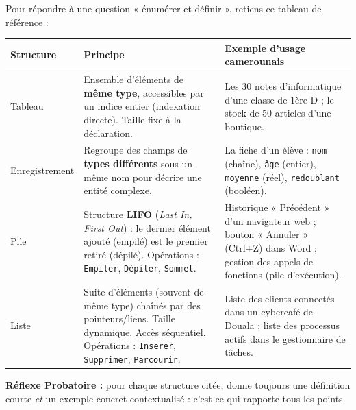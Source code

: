 \documentclass[11pt]{article}
\newcommand{\cle}[1]{{\popxbold\color{popdark}#1}}
\begin{document}
\begin{methode}
Pour répondre à une question « énumérer et définir », retiens ce tableau de référence :

\begin{center}
\begin{tabularx}{\linewidth}{|l|X|X|}
\hline
\rowcolor{popblueL} Structure & Principe & Exemple d'usage camerounais \\
\hline
\cle{Tableau} & Ensemble d'éléments de \textbf{même type}, accessibles par un indice entier (indexation directe). Taille fixe à la déclaration. & Les 30 notes d'informatique d'une classe de 1ère D ; le stock de 50 articles d'une boutique. \\
\hline
\cle{Enregistrement} & Regroupe des champs de \textbf{types différents} sous un même nom pour décrire une entité complexe. & La fiche d'un élève : \texttt{nom} (chaîne), \texttt{âge} (entier), \texttt{moyenne} (réel), \texttt{redoublant} (booléen). \\
\hline
\cle{Pile} & Structure \textbf{LIFO} (\emph{Last In, First Out}) : le dernier élément ajouté (empilé) est le premier retiré (dépilé). Opérations : \texttt{Empiler}, \texttt{Dépiler}, \texttt{Sommet}. & Historique « Précédent » d'un navigateur web ; bouton « Annuler » (Ctrl+Z) dans Word ; gestion des appels de fonctions (pile d'exécution). \\
\hline
\cle{Liste} & Suite d'éléments (souvent de même type) chaînés par des pointeurs/liens. Taille dynamique. Accès séquentiel. Opérations : \texttt{Inserer}, \texttt{Supprimer}, \texttt{Parcourir}. & Liste des clients connectés dans un cybercafé de Douala ; liste des processus actifs dans le gestionnaire de tâches. \\
\hline
\end{tabularx}
\end{center}

\textbf{Réflexe Probatoire :} pour chaque structure citée, donne toujours une définition courte \emph{et} un exemple concret contextualisé : c'est ce qui rapporte tous les points.
\end{methode}
\end{document}
